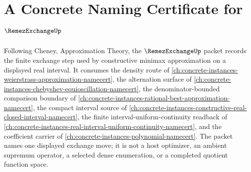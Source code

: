 \chapter{A Concrete Naming Certificate for $\RemezExchangeUp$}
\label{ch:concrete-instances-remez-exchange-namecert}

Following Cheney, Approximation Theory, the $\RemezExchangeUp$ packet records the finite exchange step used by constructive minimax approximation on a displayed real interval. It consumes the density route of \autoref{ch:concrete-instances-weierstrass-approximation-namecert}, the alternation surface of \autoref{ch:concrete-instances-chebyshev-equioscillation-namecert}, the denominator-bounded comparison boundary of \autoref{ch:concrete-instances-rational-best-approximation-namecert}, the compact interval source of \autoref{ch:concrete-instances-constructive-real-closed-interval-namecert}, the finite interval-uniform-continuity readback of \autoref{ch:concrete-instances-real-interval-uniform-continuity-namecert}, and the coefficient carrier of \autoref{ch:concrete-instances-polynomial-namecert}. The packet names one displayed exchange move; it is not a host optimizer, an ambient supremum operator, a selected dense enumeration, or a completed quotient function space.

